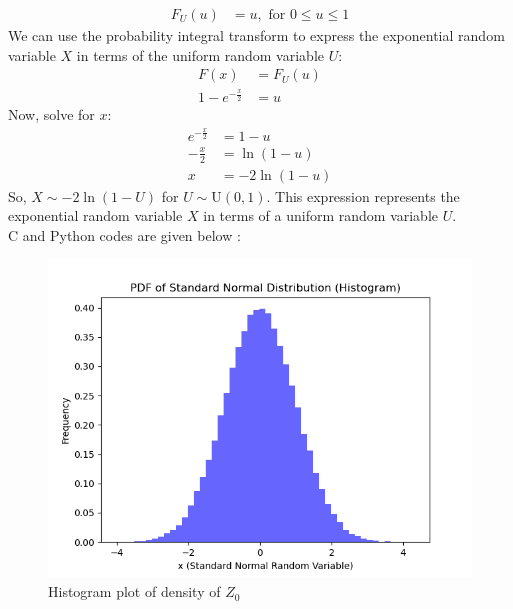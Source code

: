 \documentclass[article]{IEEEtran}
\theoremstyle{remark}
\begin{document}
\begin{align}
F_U(u) &= u, \text{ for } 0 \leq u \leq 1
\end{align}
We can use the probability integral transform to express the exponential random variable $X$ in terms of the uniform random variable $U$:
\begin{align}
F(x) &= F_U(u) \\
1 - e^{-\frac{x}{2}} &= u
\end{align}
Now, solve for $x$:
\begin{align}
e^{-\frac{x}{2}} &= 1 - u \\
-\frac{x}{2} &= \ln(1 - u) \\
x &= -2 \ln(1 - u)
\end{align}
So, $X \sim -2 \ln(1 - U)$ for $U \sim \text{U}(0, 1)$. This expression represents the exponential random variable $X$ in terms of a uniform random variable $U$.\\
C and Python codes are given below :
  
  
\begin{figure}[!ht]
  \centering
  \includegraphics[width=\columnwidth]{2023/ST/15/figs/figure1.png}  %
  \caption{Histogram plot of density of $Z_0$}
  \label{fig:your_label}
\end{figure}
\end{document}

